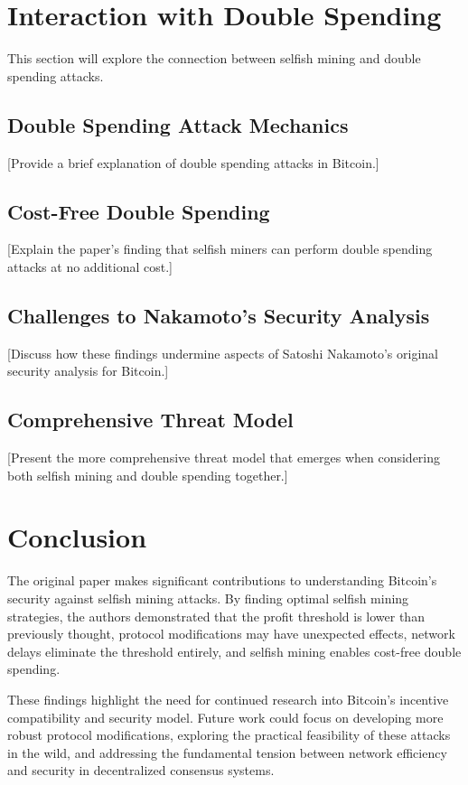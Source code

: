 \documentclass[conference]{IEEEtran}
\begin{document}
\section{Interaction with Double Spending}

This section will explore the connection between selfish mining and double spending attacks.

\subsection{Double Spending Attack Mechanics}

[Provide a brief explanation of double spending attacks in Bitcoin.]

\subsection{Cost-Free Double Spending}

[Explain the paper's finding that selfish miners can perform double spending attacks at no additional cost.]

\subsection{Challenges to Nakamoto's Security Analysis}

[Discuss how these findings undermine aspects of Satoshi Nakamoto's original security analysis for Bitcoin.]

\subsection{Comprehensive Threat Model}

[Present the more comprehensive threat model that emerges when considering both selfish mining and double spending together.]

\section{Conclusion}

The original paper makes significant contributions to understanding Bitcoin's security against selfish mining attacks. By finding optimal selfish mining strategies, the authors demonstrated that the profit threshold is lower than previously thought, protocol modifications may have unexpected effects, network delays eliminate the threshold entirely, and selfish mining enables cost-free double spending.

These findings highlight the need for continued research into Bitcoin's incentive compatibility and security model. Future work could focus on developing more robust protocol modifications, exploring the practical feasibility of these attacks in the wild, and addressing the fundamental tension between network efficiency and security in decentralized consensus systems.



\end{document}
